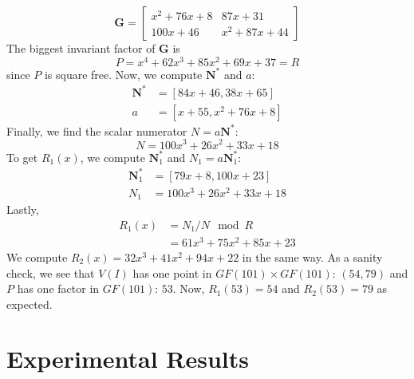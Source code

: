 \documentclass[12pt]{article}
\def\mG{\mathbf{G}}
\def\mN{\mathbf{N}}
\begin{document}
$$ \mG =
\begin{bmatrix}
x^2 + 76x + 8&       87x + 31\\
    100x + 46& x^2 + 87x + 44
\end{bmatrix}
$$
The biggest invariant factor of $\mG$ is 
$$P = x^4 + 62x^3 + 85x^2 + 69x + 37 = R$$
since $P$ is square free. 
Now, we compute $\mN^*$ and $a$:
\begin{align*}
\mN^* &=[84x + 46, 38x + 65]\\
a &= [x + 55, x^2 + 76x + 8]
\end{align*}
Finally, we find the scalar numerator $N = a\mN^*$:
$$ N = 100x^3 + 26x^2 + 33x + 18$$
To get $R_1(x)$, we compute $\mN_1^*$ and $N_1=a\mN_1^*$:
\begin{align*}
\mN_1^* &= [79x + 8, 100x + 23]\\
N_1 &= 100x^3 + 26x^2 + 33x + 18
\end{align*}
Lastly,
\begin{align*}
R_1(x) &= N_1 / N \mod R \\
       &= 61x^3 + 75x^2 + 85x + 23
\end{align*}
We compute $R_2(x)= 32x^3 + 41x^2 + 94x + 22$ in the same way. 
As a sanity check,
we see that $V(I)$ has one point in $GF(101) \times GF(101)$:
$(54,79)$ and $P$ has one factor in $GF(101)$: $53$. Now,
$R_1(53) = 54$ and $R_2(53) = 79$ as expected.
\newpage
\section{Experimental Results}

\newpage


\end{document}
